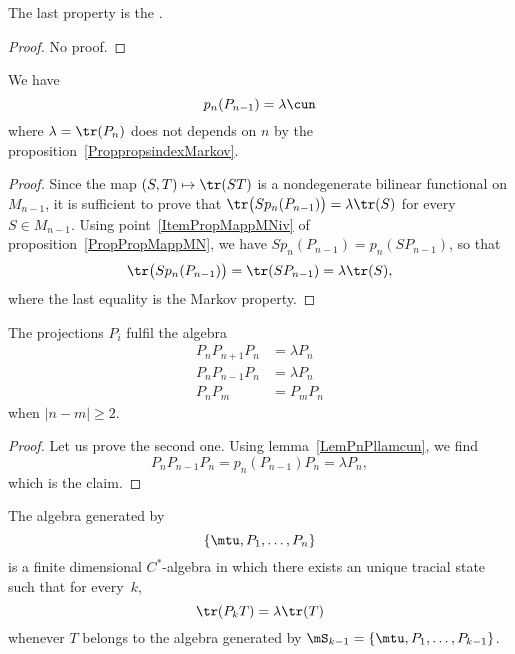 The last property is the .

\begin{proof}
No proof.
\end{proof}

\begin{lemma}		\label{LemPnPllamcun}
We have
\begin{equation}
	p_n(P_{n-1})=\lambda\cun
\end{equation}
where $\lambda=\tr(P_n)$ does not depends on $n$ by the proposition~\ref{ProppropsindexMarkov}.
\end{lemma}

\begin{proof}
Since the map $(S,T)\mapsto\tr(ST)$ is a nondegenerate bilinear functional on $M_{n-1}$, it is sufficient to prove that $\tr\big( Sp_n(P_{n-1}) \big)=\lambda\tr(S)$ for every $S\in M_{n-1}$. Using point~\ref{ItemPropMappMNiv} of proposition~\ref{PropPropMappMN}, we have $Sp_n(P_{n-1})=p_n(SP_{n-1})$, so that
\begin{equation}
	\tr\big( Sp_n(P_{n-1}) \big)=\tr(SP_{n-1})=\lambda\tr(S),
\end{equation}
where the last equality is the Markov property.
\end{proof}

\begin{proposition}		\label{PropAlgPPPKoi}
	The projections $P_i$ fulfil the algebra
	\begin{subequations}		\label{SubeqPnPalgPPI}
	\begin{align}
		P_nP_{n+1}P_n&=\lambda P_n		\label{EqLoiPPun}		\\
		P_nP_{n-1}P_n&=\lambda P_n		\label{EqLoiPPdeux}		\\
		P_nP_m&=P_mP_n				\label{EqLoiPPtrois}
	\end{align}
	\end{subequations}
	when $| n-m |\geq 2$.
\end{proposition}

\begin{proof}
	Let us prove the second one. Using lemma~\ref{LemPnPllamcun}, we find
	\begin{equation}
		P_nP_{n-1}P_n=p_n(P_{n-1})P_n = \lambda P_n,
	\end{equation}
	which is the claim.
\end{proof}

\begin{corollary}
	The algebra generated by
	\begin{equation}
		\{ \mtu,P_1,\ldots, P_n\}
	\end{equation}
	is a finite dimensional $C^*$-algebra in which there exists an unique tracial state such that for every~$k$,
	\begin{equation}
		\tr(P_kT)=\lambda \tr(T)
	\end{equation}
	whenever $T$ belongs to the algebra generated by $\mS_{k-1}=\{ \mtu,P_1,\ldots,P_{k-1} \}$.
\end{corollary}

